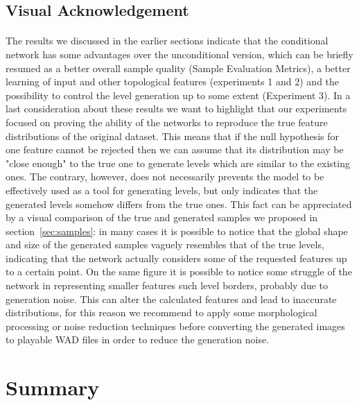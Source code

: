 \subsection{Visual Acknowledgement}
\paragraph{} The results we discussed in the earlier sections indicate that the conditional network has some advantages over the unconditional version, which can be briefly resumed as a better overall sample quality (Sample Evaluation Metrics), a better learning of input and other topological features (experiments 1 and 2) and the possibility to control the level generation up to some extent (Experiment 3). In a last consideration about these results we want to highlight that our experiments focused on proving the ability of the networks to reproduce the true feature distributions of the original dataset. This means that if the null hypothesis for one feature cannot be rejected then we can assume that its distribution may be "close enough" to the true one to generate levels which are similar to the existing ones. The contrary, however, does not necessarily prevents the model to be effectively used as a tool for generating levels, but only indicates that the generated levels somehow differs from the true ones. This fact can be appreciated by a visual comparison of the true and generated samples we proposed in section~\ref{sec:samples}: in many cases it is possible to notice that the global shape and size of the generated samples vaguely resembles that of the true levels, indicating that the network actually considers some of the requested features up to a certain point. On the same figure it is possible to notice some struggle of the network in representing smaller features such level borders, probably due to generation noise. This can alter the calculated features and lead to inaccurate distributions, for this reason we recommend to apply some morphological processing or noise reduction techniques before converting the generated images to playable WAD files in order to reduce the generation noise.



\section{Summary}
